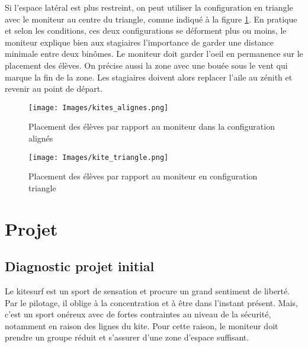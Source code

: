 \documentclass[11pt,a4paper]{report}
\begin{document}
Si l'espace latéral est plus restreint, on peut utiliser la configuration
en triangle avec le moniteur au centre du triangle, comme indiqué à la figure
\ref{kite_triangle}.
En pratique et selon les conditions, ces deux configurations se déforment plus ou moins, 
le moniteur explique bien aux stagiaires l'importance de garder une distance minimale 
entre deux binômes. Le moniteur doit garder l'oeil en permanence sur le
placement des élèves. On précise aussi la zone avec une bouée sous le vent qui marque
la fin de la zone. Les stagiaires doivent alors replacer l'aile au zénith et 
revenir au point de départ.


\begin{figure}
\begin{minipage}{0.4\textwidth}
\texttt{[image: Images/kites\_alignes.png]} 
\caption{Placement des élèves par rapport au moniteur dans la configuration
alignés\label{kites_alignes}}
\end{minipage}
\hfill
\begin{minipage}{0.4\textwidth}
\texttt{[image: Images/kite\_triangle.png]} 
\caption{Placement des élèves par rapport au moniteur en configuration
triangle\label{kite_triangle}}
\end{minipage}
\end{figure}






\FloatBarrier
\section{Projet}
\subsection{Diagnostic projet initial}

Le kitesurf est un sport de sensation et procure un grand
sentiment de liberté. Par le pilotage, il oblige à 
la concentration et à \^etre dans l'instant présent.
Mais, c'est un sport onéreux avec de fortes contraintes
au niveau de la sécurité, notamment en raison des lignes du kite.
Pour cette raison, le moniteur doit prendre un groupe réduit
et s'assurer d'une zone  d'espace suffisant. 
\end{document}
